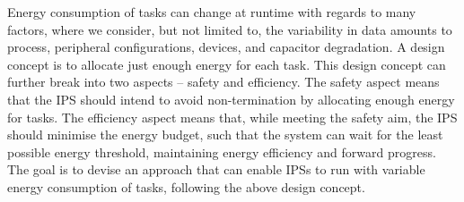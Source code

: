 \begin{enumerate}
Energy consumption of tasks can change at runtime with regards to many factors, where we consider, but not limited to, the variability in data amounts to process, peripheral configurations, devices, and capacitor degradation. 
A design concept is to allocate just enough energy for each task.
This design concept can further break into two aspects -- safety and efficiency. 
The safety aspect means that the IPS should intend to avoid non-termination by allocating enough energy for tasks.
The efficiency aspect means that, while meeting the safety aim, the IPS should minimise the energy budget, such that the system can wait for the least possible energy threshold, maintaining energy efficiency and forward progress. 
The goal is to devise an approach that can enable IPSs to run with variable energy consumption of tasks, following the above design concept. 





\end{enumerate}
